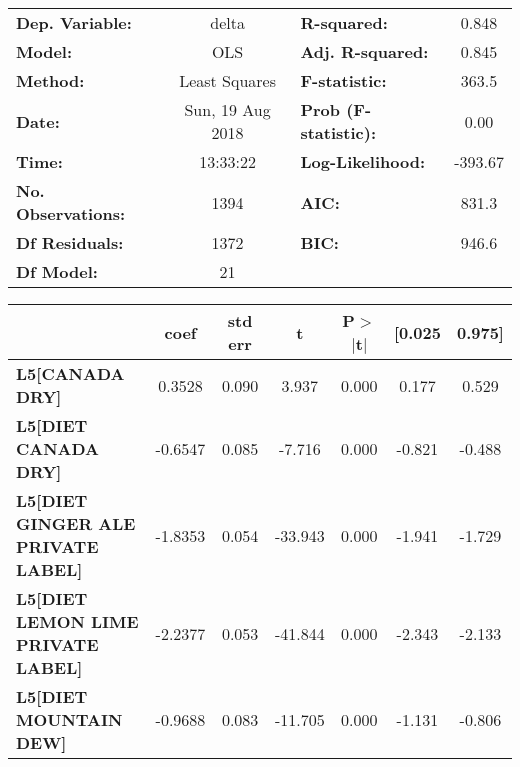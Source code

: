 \begin{center}
\begin{tabular}{lclc}
\toprule
\textbf{Dep. Variable:}                    &      delta       & \textbf{  R-squared:         } &     0.848   \\
\textbf{Model:}                            &       OLS        & \textbf{  Adj. R-squared:    } &     0.845   \\
\textbf{Method:}                           &  Least Squares   & \textbf{  F-statistic:       } &     363.5   \\
\textbf{Date:}                             & Sun, 19 Aug 2018 & \textbf{  Prob (F-statistic):} &     0.00    \\
\textbf{Time:}                             &     13:33:22     & \textbf{  Log-Likelihood:    } &   -393.67   \\
\textbf{No. Observations:}                 &        1394      & \textbf{  AIC:               } &     831.3   \\
\textbf{Df Residuals:}                     &        1372      & \textbf{  BIC:               } &     946.6   \\
\textbf{Df Model:}                         &          21      & \textbf{                     } &             \\
\bottomrule
\end{tabular}
\begin{tabular}{lcccccc}
                                           & \textbf{coef} & \textbf{std err} & \textbf{t} & \textbf{P$>$$|$t$|$} & \textbf{[0.025} & \textbf{0.975]}  \\
\midrule
\textbf{L5[CANADA DRY]}                    &       0.3528  &        0.090     &     3.937  &         0.000        &        0.177    &        0.529     \\
\textbf{L5[DIET CANADA DRY]}               &      -0.6547  &        0.085     &    -7.716  &         0.000        &       -0.821    &       -0.488     \\
\textbf{L5[DIET GINGER ALE PRIVATE LABEL]} &      -1.8353  &        0.054     &   -33.943  &         0.000        &       -1.941    &       -1.729     \\
\textbf{L5[DIET LEMON LIME PRIVATE LABEL]} &      -2.2377  &        0.053     &   -41.844  &         0.000        &       -2.343    &       -2.133     \\
\textbf{L5[DIET MOUNTAIN DEW]}             &      -0.9688  &        0.083     &   -11.705  &         0.000        &       -1.131    &       -0.806     \\

\end{tabular}
\end{center}

